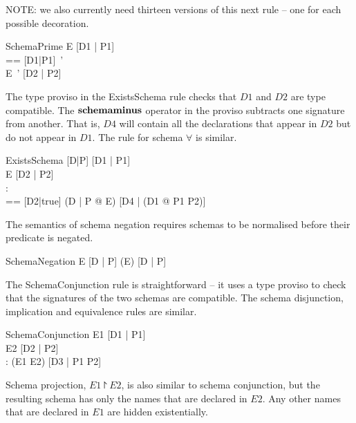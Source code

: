 \documentclass{entcs}
\newcommand{\sexprUnfoldsTo}{\mathrel{=_{se}}}
\begin{document}
NOTE: we also currently need thirteen versions of this next rule 
-- one for each possible decoration. 

\begin{zedrule}{SchemaPrime}
   E \sexprUnfoldsTo [D1 | P1] \\
   \proviso [D2|P2] == [D1|P1]~' \\
\derives
   E~' \sexprUnfoldsTo [D2 | P2]
\end{zedrule}

The type proviso in the ExistsSchema rule checks that $D1$ and $D2$
are type compatible.  The $\mathbin{\textbf{schemaminus}}$ operator in the proviso
subtracts one signature from another.  That is, $D4$ will contain all
the declarations that appear in $D2$ but do not appear in $D1$.
The rule for schema $\forall$ is similar.

\begin{zedrule}{ExistsSchema}
   [D|P] \sexprUnfoldsTo [D1 | P1] \\
   E \sexprUnfoldsTo [D2 | P2] \\
   \proviso [D1 | true] \land [D2 | true] : \power [D3] \\
   \proviso [D4|true] == [D2|true] \schemaminus [D1|true]
\derives
   (\exists D | P @ E) \sexprUnfoldsTo [D4 | (\exists D1 @ P1 \land P2)]
\end{zedrule}

The semantics of schema negation requires schemas to be
normalised before their predicate is negated.

\begin{zedrule}{SchemaNegation}
  E \sexprUnfoldsTo [D | P]
\derives
  (\lnot E) \sexprUnfoldsTo [D | \lnot P]
\end{zedrule}

The SchemaConjunction rule is straightforward -- it uses a type
proviso to check that the signatures of the two schemas are compatible.
The schema disjunction, implication and equivalence rules are similar.

\begin{zedrule}{SchemaConjunction}
  E1 \sexprUnfoldsTo [D1 | P1] \\
  E2 \sexprUnfoldsTo [D2 | P2] \\
 \proviso [D1 | true] \land [D2 | true] : \power [D3]
\derives
  (E1 \land E2) \sexprUnfoldsTo [D3 | P1 \land P2]
\end{zedrule}

Schema projection, $E1 \project E2$, is also similar to schema conjunction,
but the resulting schema has only the names that are declared in $E2$.
Any other names that are declared in $E1$ are hidden existentially.
\end{document}
